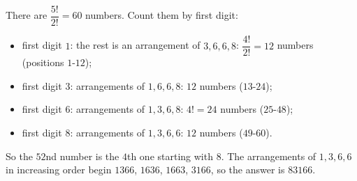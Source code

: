 There are $\dfrac{5!}{2!}=60$ numbers. Count them by first digit:
\begin{itemize}
\item first digit $1$: the rest is an arrangement of $3,6,6,8$: $\dfrac{4!}{2!}=12$ numbers (positions $1$-$12$);
\item first digit $3$: arrangements of $1,6,6,8$: $12$ numbers ($13$-$24$);
\item first digit $6$: arrangements of $1,3,6,8$: $4!=24$ numbers ($25$-$48$);
\item first digit $8$: arrangements of $1,3,6,6$: $12$ numbers ($49$-$60$).
\end{itemize}
So the $52$nd number is the $4$th one starting with $8$. The arrangements of $1,3,6,6$ in increasing order begin $1366$, $1636$, $1663$, $3166$, so the answer is $\boxed{83166}$.
